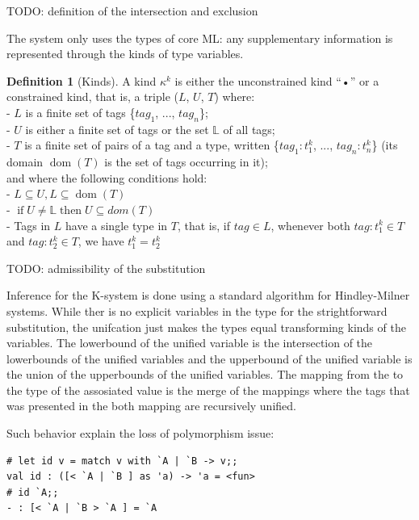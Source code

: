 \documentclass[a4paper,11pt,oneside]{article}
\theoremstyle{definition}
\newtheorem{defsec}{Definition}[section]
\begin{document}
TODO: definition of the intersection and exclusion

The system only uses the types of core ML: any supplementary information
is represented through the kinds of type variables.

\begin{defsec}[Kinds]
  A kind $\kappa^k$ is either the unconstrained kind “•” or a constrained
  kind, that is, a triple ($L$, $U$, $T$) where:\\
  - $L$ is a finite set of tags \{$tag_1$, ..., $tag_n$\};\\
  - $U$ is either a finite set of tags or the set $\mathbb{L}$ of all tags;\\
  - $T$ is a finite set of pairs of a tag and a type, written \{$tag_1 : t^k_1$,
  ..., $tag_n : t^k_n$\} (its domain $\operatorname{dom}(T)$ is the set of tags occurring
  in it);\\
  and where the following conditions hold:\\
  - $L \subseteq U , L \subseteq \operatorname{dom}(T)$\\
  - $\operatorname{if} U \not= \mathbb{L} \operatorname{then} U \subseteq dom(T)$\\
  - Tags in $L$ have a single type in $T$, that is, if $tag \in L$, whenever
  both $tag : t^k_1 \in T$ and $tag : t^k_2 \in T$, we have $t^k_1 = t^k_2$\\
\end{defsec}

TODO: admissibility of the substitution

Inference for the K-system is done using a standard algorithm for Hindley-Milner systems.
While ther is no explicit variables in the type for the strightforward substitution, the unifcation just makes the types equal transforming kinds of the variables.
The lowerbound of the unified variable is the intersection of the lowerbounds of the unified variables and the upperbound of the unified variable is the union of the upperbounds of the unified variables.
The mapping from the to the type of the assosiated value is the merge of the mappings where the tags that was presented in the both mapping are recursively unified.

Such behavior explain the loss of polymorphism issue:

{\ttfamily\begin{verbatim}
# let id v = match v with `A | `B -> v;;
val id : ([< `A | `B ] as 'a) -> 'a = <fun>
# id `A;;
- : [< `A | `B > `A ] = `A
\end{verbatim}}
\end{document}
